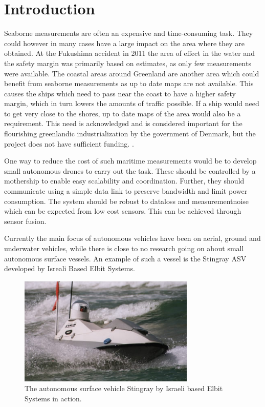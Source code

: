 \documentclass{ifacconf}
\begin{document}
\section{Introduction}
Seaborne measurements are often an expensive and time-consuming task. They could however in many cases have a large impact on the area where they are obtained. At the Fukushima accident in 2011 the area of effect in the water and the safety margin was primarily based on estimates, as only few measurements were available.
The coastal areas around Greenland are another area which could benefit from seaborne measurements as up to date maps are not available. This causes the ships which need to pass near the coast to have a higher safety margin, which in turn lowers the amounts of traffic possible. If a ship would need to get very close to the shores, up to date maps of the area would also be a requirement. This need is acknowledged and is considered important for the flourishing greenlandic industrialization by the government of Denmark, but the project does not have sufficient funding. \cite{engineer}.

One way to reduce the cost of such maritime measurements would be to develop small autonomous drones to carry out the task. These should be controlled by a mothership to enable easy scalability and coordination. Further, they should communicate using a simple data link to preserve bandwidth and limit power consumption. The system should be robust to dataloss and measurementnoise which can be expected from low cost sensors. This can be achieved through sensor fusion.

Currently the main focus of autonomous vehicles have been on aerial, ground and underwater vehicles, while there is close to no research going on about small autonomous surface vessels. An example of such a vessel is the Stingray ASV developed by Isreali Based Elbit Systems. 
\begin{figure}
	\begin{center}
		\includegraphics[width=8.4cm]{img/stingray.jpg} %
		\caption{The autonomous surface vehicle Stingray by Israeli based Elbit Systems in action.}  
		\label{fig:stingray}
	\end{center}
\end{figure}
\end{document}
